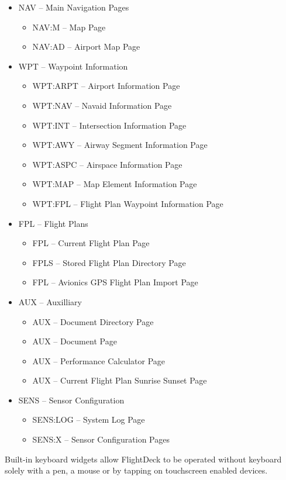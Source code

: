 \documentclass[a4paper,10pt,pdftex]{article}
\begin{document}
\begin{itemize}
\item NAV -- Main Navigation Pages
  \begin{itemize}
  \item NAV:M -- Map Page
  \item NAV:AD -- Airport Map Page
  \end{itemize}
\item WPT -- Waypoint Information
  \begin{itemize}
  \item WPT:ARPT -- Airport Information Page
  \item WPT:NAV -- Navaid Information Page
  \item WPT:INT -- Intersection Information Page
  \item WPT:AWY -- Airway Segment Information Page
  \item WPT:ASPC -- Airspace Information Page
  \item WPT:MAP -- Map Element Information Page
  \item WPT:FPL -- Flight Plan Waypoint Information Page
  \end{itemize}
\item FPL -- Flight Plans
  \begin{itemize}
  \item FPL -- Current Flight Plan Page
  \item FPLS -- Stored Flight Plan Directory Page
  \item FPL -- Avionics GPS Flight Plan Import Page
  \end{itemize}
\item AUX -- Auxilliary
  \begin{itemize}
  \item AUX -- Document Directory Page
  \item AUX -- Document Page
  \item AUX -- Performance Calculator Page
  \item AUX -- Current Flight Plan Sunrise Sunset Page
  \end{itemize}
\item SENS -- Sensor Configuration
  \begin{itemize}
  \item SENS:LOG -- System Log Page
  \item SENS:X -- Sensor Configuration Pages
  \end{itemize}
\end{itemize}

Built-in keyboard widgets allow FlightDeck to be operated without
keyboard solely with a pen, a mouse or by tapping on touchscreen
enabled devices.
\end{document}
